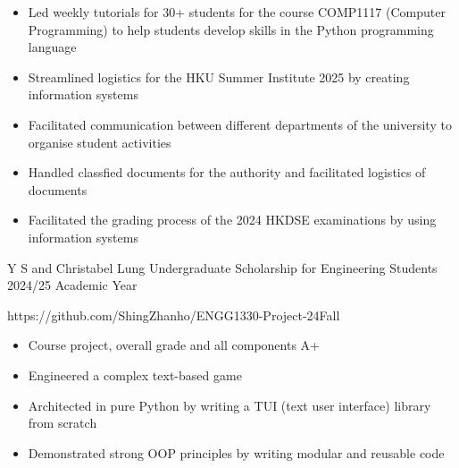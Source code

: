 \documentclass[10pt,a4paper,withhypeper,normalphoto]{altacv}
\begin{document}
\begin{paracol}{2}


\begin{itemize}
  \item Led weekly tutorials for 30+ students for the course COMP1117 (Computer Programming) to help students develop skills in the Python programming language
\end{itemize}

\divider

\begin{itemize}
\item Streamlined logistics for the HKU Summer Institute 2025 by creating information systems
\item Facilitated communication between different departments of the university to organise student activities
\end{itemize}

\divider


\begin{itemize}
\item Handled classfied documents for the authority and facilitated logistics of documents
\item Facilitated the grading process of the 2024 HKDSE examinations by using information systems
\end{itemize}


\cvachievement
  {\faTrophy}
  {Y S and Christabel Lung Undergraduate Scholarship for Engineering Students}
  {2024/25 Academic Year}



{
{\small https://github.com/ShingZhanho/ENGG1330-Project-24Fall}
\begin{itemize}
  \item Course project, overall grade and all components A+
  \item Engineered a complex text-based game
  \item Architected in pure Python by writing a TUI (text user interface) library from scratch
  \item Demonstrated strong OOP principles by writing modular and reusable code
\end{itemize}
}


\end{paracol}
\end{document}
